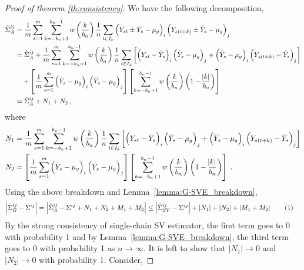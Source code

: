 \documentclass[11pt]{article}
\newcommand\numberthis{\addtocounter{equation}{1}\tag{\theequation}}
\theoremstyle{remark}
\begin{document}
\begin{proof}[Proof of theorem \ref{th:consistency}]
We have the following decomposition,
\begin{align*}
\tilde{\Sigma}_{A}^{ij}
    & = \dfrac{1}{m}\sum_{s=1}^{m}\sum_{k=-b_n+1}^{b_n-1}w\left(\dfrac{k}{b_n}\right)\dfrac{1}{n}\sum_{t \in I_k}  \left(Y_{st} \pm \bar{Y}_s - \mu_g \right)_i  \left(Y_{s(t + k)} \pm \bar{Y}_s - \mu_g \right)_j\\
    & = \hat{\Sigma}_{A}^{ij} + \dfrac{1}{m}\sum_{s=1}^{m}\sum_{k=-b_n+1}^{b_n-1}w\left(\dfrac{k}{b_n}\right)\dfrac{1}{n}\sum_{t \in I_k}\left[ \left(Y_{st} - \bar{Y}_s \right)_i   \left(\bar{Y}_s - \mu_g \right)_j + \left(\bar{Y}_s - \mu_g \right)_i  \left(Y_{s(t+k)} - \bar{Y}_s \right)_j\right]\\
    & \quad + \left[\dfrac{1}{m}  \sum_{s=1}^{m}  \left(\bar{Y}_s - \mu_g \right)_i  \left(\bar{Y}_s - \mu_g \right)_j \right]  \left[\sum_{k=-b_n+1}^{b_n-1}w\left(\dfrac{k}{b_n}\right)\left(1 - \dfrac{\abs{k}}{b_n}\right) \right]\\
    & = \hat{\Sigma}_{A}^{ij} + N_1 + N_2 \,,
\end{align*}
where
\begin{align*}
N_1 & = \dfrac{1}{m}\sum_{s=1}^{m}  \sum_{k=-b_n+1}^{b_n-1}  w\left(\dfrac{k}{b_n}\right)\dfrac{1}{n}  \sum_{t \in I_k}  \left[ \left(Y_{st} - \bar{Y}_s \right)_i  \left(\bar{Y}_s - \mu_g \right)_j + \left(\bar{Y}_s - \mu_g \right)_i  \left(Y_{s(t+k)} - \bar{Y}_s \right)_j\right]\\
N_2 & = \left[\dfrac{1}{m}  \sum_{s=1}^{m}  \left(\bar{Y}_s - \mu_g \right)_i  \left(\bar{Y}_s - \mu_g \right)_j \right]  \left[\sum_{k=-b_n+1}^{b_n-1}w\left(\dfrac{k}{b_n}\right)\left(1 - \dfrac{\abs{k}}{b_n}\right) \right]\;.
\end{align*}
%
Using the above breakdown and  Lemma~\ref{lemma:G-SVE_breakdown}, 
\begin{align*}
\left|\hat{\Sigma}_{G}^{ij} - \Sigma^{ij} \right| & = \left| \hat{\Sigma}_{A}^{ij} - \Sigma^{ij} + N_1 + N_2 + M_1 + M_2 \right|  \leq \left| \hat{\Sigma}_{SV}^{ij} - \Sigma^{ij} \right| +  \left| N_1 \right| +  \left|N_2 \right| + \left| M_1 + M_2 \right| \numberthis \label{eq:G-SVE_full_decomp}
\end{align*}
%
By the strong consistency of single-chain SV estimator, the first term goes to 0 with probability 1 and by Lemma~\ref{lemma:G-SVE_breakdown}, the third term goes to 0 with probability 1 as $n \to \infty$. It is left to show that $|N_1| \to 0$ and $|N_2| \to 0$ with probability 1. Consider,

\end{proof}
\end{document}
